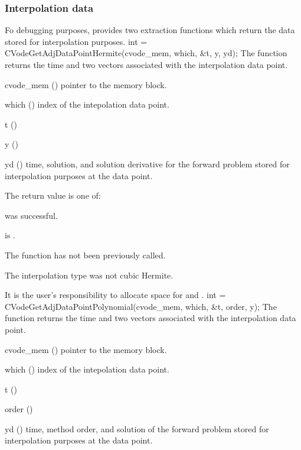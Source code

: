 \subsubsection{Interpolation data}
Fo debugging purposes, {\cvodea} provides two extraction functions which 
return the data stored for interpolation purposes.
{
  int = CVodeGetAdjDataPointHermite(cvode\_mem, which, \&t, y, yd);
}
{
  The function  returns the
  time and two vectors associated with the  interpolation data point.
}
{
  \begin{args}
  \item[cvode\_mem] ()
    pointer to the {\cvodes} memory block.
  \item[which] ()
    index of the intepolation data point.
  \item[t] ()
  \item[y] ()
  \item[yd] ()
    time, solution, and solution derivative for the forward problem 
    stored for interpolation purposes at the  data point.
  \end{args}
}
{
  The return value  is one of:
  \begin{args}
  \item[\Id{CV\_SUCCESS}] 
     was successful.
  \item[\Id{CV\_MEM\_NULL}] 
     is .
  \item[\Id{CV\_NO\_ADJ}]
    The function  has not been previously called.
  \item[\Id{CV\_ILL\_INPUT}]
    The interpolation type was not cubic Hermite.
  \end{args}
}
{
  It is the user's responsibility to allocate space for  and .
}
{
  int = CVodeGetAdjDataPointPolynomial(cvode\_mem, which, \&t, order, y);
}
{
  The function  returns the
  time and two vectors associated with the  interpolation data point.
}
{
  \begin{args}
  \item[cvode\_mem] ()
    pointer to the {\cvodes} memory block.
  \item[which] ()
    index of the intepolation data point.
  \item[t] ()
  \item[order] ()
  \item[yd] ()
    time, method order, and solution of the forward problem 
    stored for interpolation purposes at the  data point.
  \end{args}
}
